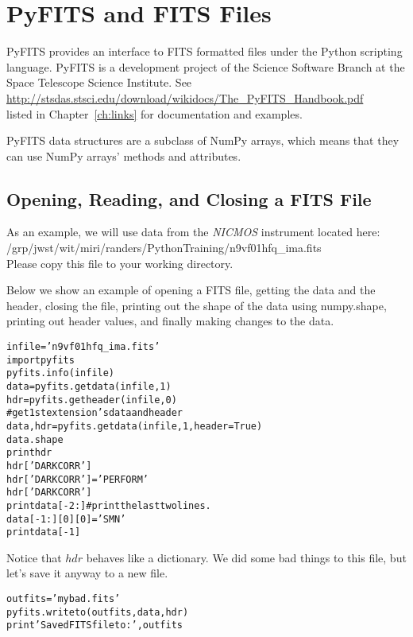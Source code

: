 \chapter{PyFITS and FITS Files}
\label{ch:pyfits}
PyFITS provides an interface to FITS formatted files under the Python
scripting language.  PyFITS is a development project of the Science
Software Branch at the Space Telescope Science Institute.  See \\
\url{http://stsdas.stsci.edu/download/wikidocs/The_PyFITS_Handbook.pdf} \\
listed in Chapter~\ref{ch:links} for documentation and
examples.

PyFITS data structures are a subclass of NumPy arrays, which means
that they can use NumPy arrays' methods and attributes.
 
\section{Opening, Reading, and Closing a FITS File }
As an example, we will use data from the \emph{NICMOS} instrument located here:  \\
/grp/jwst/wit/miri/randers/PythonTraining/n9vf01hfq\_ima.fits \\ 
Please copy this file to your working directory. 

Below we show an example of opening a FITS file, getting
the data and the header, closing the file, printing out the shape of
the data using {\sf \small numpy.shape}, printing out header values,
and finally making changes to the data.

\begin{alltt}
\pytab infile = 'n9vf01hfq_ima.fits'
\pytab import pyfits 
\pytab pyfits.info(infile)
\pytab data = pyfits.getdata(infile,1) 
\pytab hdr = pyfits.getheader(infile,0) 
# get 1st extension's data and header 
\pytab data, hdr = pyfits.getdata(infile, 1, header=True)
\pytab data.shape
\pytab print hdr 
\pytab hdr['DARKCORR'] 
\pytab hdr['DARKCORR'] = 'PERFORM'
\pytab hdr['DARKCORR']
\pytab print data[-2:]  #print the last two lines.
\pytab data[-1:][0][0] = 'SMN'
\pytab print data[-1]
\end{alltt}

Notice that $hdr$ behaves like a dictionary.  We did some
bad things to this file, but let's save it anyway to a new file.

\begin{alltt}
\pytab outfits = 'mybad.fits'
\pytab pyfits.writeto(outfits, data, hdr)
\pytab print 'Saved FITS file to: ',outfits
\end{alltt}

